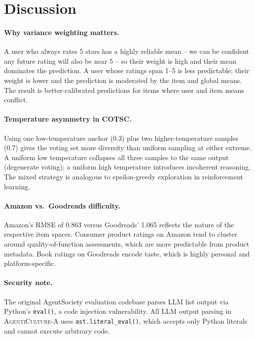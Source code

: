 \documentclass[11pt]{article}
\newcommand{\system}{\textsc{AgentiCulture}\xspace}
\begin{document}
\section{Discussion}

\paragraph{Why variance weighting matters.}
A user who always rates 5 stars has a highly reliable mean -- we can be
confident any future rating will also be near 5 -- so their weight is high
and their mean dominates the prediction.
A user whose ratings span 1--5 is less predictable; their weight is lower
and the prediction is moderated by the item and global means.
The result is better-calibrated predictions for items where user and item
means conflict.

\paragraph{Temperature asymmetry in COTSC.}
Using one low-temperature anchor (0.3) plus two higher-temperature samples (0.7)
gives the voting set more diversity than uniform sampling at either extreme.
A uniform low temperature collapses all three samples to the same output
(degenerate voting); a uniform high temperature introduces incoherent reasoning.
The mixed strategy is analogous to epsilon-greedy exploration in reinforcement
learning.

\paragraph{Amazon vs.\ Goodreads difficulty.}
Amazon's RMSE of 0.863 versus Goodreads' 1.065 reflects the nature of the
respective item spaces.
Consumer product ratings on Amazon tend to cluster around quality-of-function
assessments, which are more predictable from product metadata.
Book ratings on Goodreads encode taste, which is highly personal and
platform-specific.

\paragraph{Security note.}
The original AgentSociety evaluation codebase parses LLM list output via
Python's \texttt{eval()}, a code injection vulnerability.
All LLM output parsing in \system-A uses \texttt{ast.literal\_eval()},
which accepts only Python literals and cannot execute arbitrary code.
\end{document}
